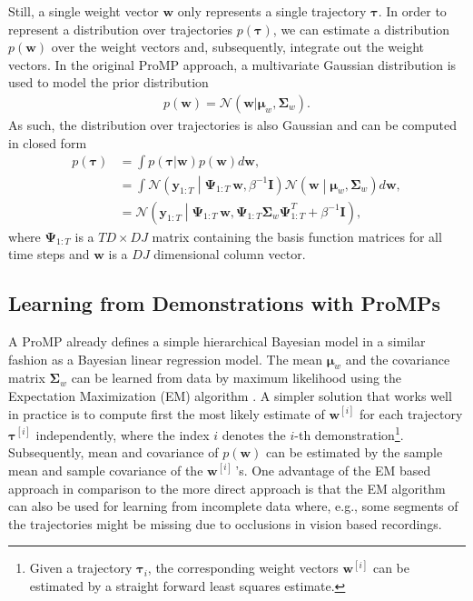\documentclass[letterpaper, 10 pt, conference]{ieeeconf}  %
\newcommand{\N}{\ensuremath{\mathcal{N}}}
\renewcommand{\vec}[1]{\ensuremath{\boldsymbol{#1}}}
\begin{document}
Still, a single weight vector $\vec w$ only represents a single trajectory $\vec \tau$. In order to represent a distribution over 
trajectories $p(\vec \tau)$, we can estimate a distribution $p(\vec w)$ over the weight vectors and, subsequently, integrate out the weight vectors. 
In the original ProMP approach, a multivariate Gaussian distribution is used to model the prior distribution 
\begin{align}\label{eq:priorProMPs}
p(\vec w) = \N(\vec w| \vec \mu_w, \vec \Sigma_w). 
\end{align}
As such, the distribution over trajectories is also Gaussian and can be computed in closed form 
\begin{align*}
 p(\vec \tau) & =  \int p(\vec \tau| \vec w) p(\vec w) d\vec w, \\
 & =  \int \N\left(\vec y_{1:T}\middle| \vec \Psi_{1:T} \, \vec w, \beta^{-1}
    \vec I\right)  \N\left(\vec w\middle| \vec \mu_w, \vec \Sigma_w\right) d\vec w,  \\
  & = \N\left(\vec y_{1:T}\middle| \vec \Psi_{1:T} \, \vec w, \vec \Psi_{1:T}
    \vec \Sigma_w \vec \Psi_{1:T}^T + \beta^{-1} \vec I\right),
\end{align*}
where $\vec \Psi_{1:T}$ is a $T D \times D J$ matrix containing the basis function matrices for all time steps 
and $\vec w$ is a $D J$ dimensional column vector.

\subsection{Learning from Demonstrations with ProMPs}

A ProMP already defines a simple hierarchical Bayesian model in a similar fashion as a Bayesian linear regression model. The mean $\vec \mu_w$ 
and the covariance matrix $\vec \Sigma_w$ can be learned from data by maximum likelihood using the Expectation Maximization (EM) algorithm \cite{Dempster1977}. 
A simpler solution that works well in practice is to compute first the most likely estimate of $\vec w^{[i]}$ for each trajectory $\vec \tau^{[i]}$ independently,
 where the index $i$ denotes the $i$-th demonstration\footnote{Given a trajectory $\vec \tau_i$, the corresponding 
weight vectors $\vec w^{[i]}$ can be estimated by a straight forward least squares estimate.}. 
Subsequently, mean and covariance of $p(\vec w)$ can be estimated 
by the sample mean and sample covariance of the $\vec w^{[i]}\,$'s. 
One advantage of the EM based approach in comparison to the more direct approach is that the 
EM algorithm can also be used for learning from incomplete data where, e.g., 
some segments of the trajectories might be missing due to occlusions in vision based recordings.
\end{document}
